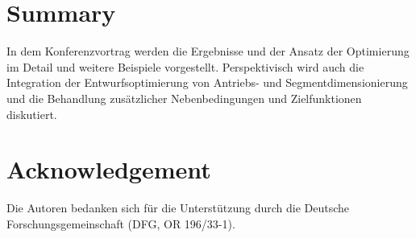 \documentclass[fleqn,a4paper,10pt]{article}
\begin{document}
\begin{multicols}{2}



\section{Summary}
\label{sec:summary}

In dem Konferenzvortrag werden die Ergebnisse und der Ansatz der Optimierung im Detail und weitere Beispiele vorgestellt.
Perspektivisch wird auch die Integration der Entwurfsoptimierung von Antriebs- und Segmentdimensionierung und die Behandlung zusätzlicher Nebenbedingungen und Zielfunktionen diskutiert.


\section{Acknowledgement}

Die Autoren bedanken sich für die Unterstützung durch die Deutsche Forschungsgemeinschaft (DFG, OR 196/33-1).






\end{multicols}
\end{document}
